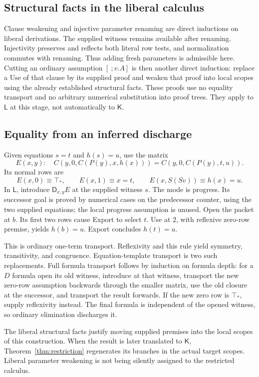 \documentclass[11pt,letterpaper]{article}
\theoremstyle{definition}\newtheorem{definition}[theorem]{Definition}
\theoremstyle{remark}\newtheorem{remark}[theorem]{Remark}
\newcommand{\K}{\mathsf K}
\newcommand{\Liberal}{\mathsf L}
\newcommand{\DD}{\mathsf D}
\newcommand{\ttop}{\top_*}
\begin{document}
\subsection{Structural facts in the liberal calculus}
Clause weakening and injective parameter renaming are direct inductions
on liberal derivations. The supplied witness remains available after
renaming. Injectivity preserves and reflects both literal row tests,
and normalization commutes with renaming. Thus adding fresh parameters
is admissible here. Cutting an ordinary assumption $[\ ;v.A]$ is
then another direct induction: replace a Use of that clause by its
supplied proof and weaken that proof into local scopes using the
already established structural facts. These proofs use no equality
transport and no arbitrary numerical substitution into proof trees.
They apply to $\Liberal$ at this stage, not automatically to $\K$.

\subsection{Equality from an inferred discharge}
Given equations $s=t$ and $h(s)=u$, use the matrix
\begin{equation}\label{eq:equality-packet}
 E(x,y):\quad
 C(y,0,C(P(y),x,h(x)))=
 C(y,0,C(P(y),t,u)).
\end{equation}
Its normal rows are
\[
 E(x,0)\equiv\ttop,\qquad E(x,1)\equiv x=t,\qquad
 E(x,S(Sv))\equiv h(x)=u.
\]
In $\Liberal$, introduce $\DD_{x,y}E$ at the supplied witness $s$.
The mode is progress. Its successor goal is proved by numerical cases
on the predecessor counter, using the two supplied equations; the local
progress assumption is unused. Open the packet at $b$. Its first two
rows cause Export to select $t$. Use at $2$, with reflexive zero-row
premise, yields $h(b)=u$. Export concludes $h(t)=u$.

This is ordinary one-term transport. Reflexivity and this rule yield
symmetry, transitivity, and congruence. Equation-template transport is
two such replacements. Full formula transport follows by induction on
formula depth: for a $D$ formula open its old witness, introduce at that
witness, transport the new zero-row assumption backwards through the
smaller matrix, use the old closure at the successor, and transport the
result forwards. If the new zero row is $\ttop$, supply reflexivity
instead. The final formula is independent of the opened witness, so
ordinary elimination discharges it.

The liberal structural facts justify moving supplied premises into the
local scopes of this construction. When the result is later translated
to $\K$, Theorem~\ref{thm:restriction} regenerates its branches in the
actual target scopes. Liberal parameter weakening is not being silently
assigned to the restricted calculus.
\end{document}
